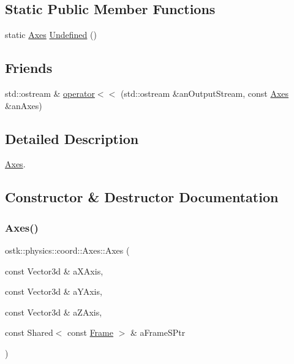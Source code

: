 \subsection*{Static Public Member Functions}
\begin{DoxyCompactItemize}
\item 
static \hyperlink{classostk_1_1physics_1_1coord_1_1_axes}{Axes} \hyperlink{classostk_1_1physics_1_1coord_1_1_axes_a6a354bad1c6c5e44ba514ed96f984151}{Undefined} ()
\end{DoxyCompactItemize}
\subsection*{Friends}
\begin{DoxyCompactItemize}
\item 
std\+::ostream \& \hyperlink{classostk_1_1physics_1_1coord_1_1_axes_a0ed7e604ae11f069877a8ee1a2d9b051}{operator$<$$<$} (std\+::ostream \&an\+Output\+Stream, const \hyperlink{classostk_1_1physics_1_1coord_1_1_axes}{Axes} \&an\+Axes)
\end{DoxyCompactItemize}


\subsection{Detailed Description}
\hyperlink{classostk_1_1physics_1_1coord_1_1_axes}{Axes}. 

\subsection{Constructor \& Destructor Documentation}
\mbox{\label{classostk_1_1physics_1_1coord_1_1_axes_abed0f87ab7a6a493f3576a8fa7426051}} 
\subsubsection{\texorpdfstring{Axes()}{Axes()}}
{\footnotesize\ttfamily ostk\+::physics\+::coord\+::\+Axes\+::\+Axes (\begin{DoxyParamCaption}\item[{const Vector3d \&}]{a\+X\+Axis,  }\item[{const Vector3d \&}]{a\+Y\+Axis,  }\item[{const Vector3d \&}]{a\+Z\+Axis,  }\item[{const Shared$<$ const \hyperlink{classostk_1_1physics_1_1coord_1_1_frame}{Frame} $>$ \&}]{a\+Frame\+S\+Ptr }\end{DoxyParamCaption})}



